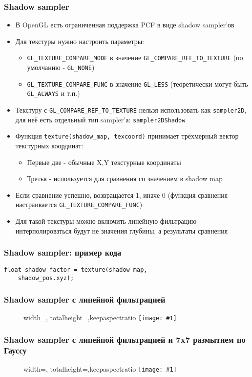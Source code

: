 \documentclass{beamer}
\newcommand{\slideimage}[1]{
  \begin{figure}
    \begin{adjustbox}{width=\textwidth, totalheight=\textheight-2\baselineskip-2\baselineskip,keepaspectratio}
      \texttt{[image: \#1]}
    \end{adjustbox}
  \end{figure}
}
\begin{document}
\begin{frame}[fragile]
\frametitle{Shadow sampler}
\fontsize{10pt}{10pt}
\begin{itemize}
\item В OpenGL есть ограниченная поддержка PCF в виде shadow sampler'ов
\pause
\item Для текстуры нужно настроить параметры:
\begin{itemize}
\item \verb|GL_TEXTURE_COMPARE_MODE| в значение \verb|GL_COMPARE_REF_TO_TEXTURE| (по умолчанию - \verb|GL_NONE|)
\item \verb|GL_TEXTURE_COMPARE_FUNC| в значение \verb|GL_LESS| (теоретически могут быть \verb|GL_ALWAYS| и т.п.)
\end{itemize}
\pause
\item Текстуру с \verb|GL_COMPARE_REF_TO_TEXTURE| нельзя использовать как \verb|sampler2D|, для неё есть отдельный тип sampler'а: \verb|sampler2DShadow|
\pause
\item Функция \verb|texture(shadow_map, texcoord)| принимает трёхмерный вектор текстурных координат:
\begin{itemize}
\item Первые две - обычные X,Y текстурные координаты
\item Третья - используется для сравнения со значением в shadow map
\end{itemize}
\pause
\item Если сравнение успешно, возвращается 1, иначе 0 (функция сравнения настраивается \verb|GL_TEXTURE_COMPARE_FUNC|)
\pause
\item Для такой текстуры можно включить линейную фильтрацию - интерполироваться будут не значения глубины, а результаты сравнения
\end{itemize}
\end{frame}

\begin{frame}[fragile]
\frametitle{Shadow sampler: пример кода}
\begin{verbatim}
float shadow_factor = texture(shadow_map,
    shadow_pos.xyz);
\end{verbatim}
\end{frame}

\begin{frame}[fragile]
\frametitle{Shadow sampler с линейной фильтрацией}
\slideimage{pcf.png}
\end{frame}

\begin{frame}[fragile]
\frametitle{Shadow sampler с линейной фильтрацией и 7x7 размытием по Гауссу}
\slideimage{pcf_gauss.png}
\end{frame}
\end{document}
